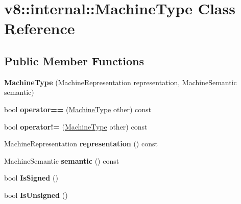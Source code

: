 \hypertarget{classv8_1_1internal_1_1_machine_type}{}\section{v8\+:\+:internal\+:\+:Machine\+Type Class Reference}
\label{classv8_1_1internal_1_1_machine_type}
\subsection*{Public Member Functions}
\begin{DoxyCompactItemize}
\item 
{\bfseries Machine\+Type} (Machine\+Representation representation, Machine\+Semantic semantic)\hypertarget{classv8_1_1internal_1_1_machine_type_a613ab0cec718bb37f6cf7af9528da6ab}{}\label{classv8_1_1internal_1_1_machine_type_a613ab0cec718bb37f6cf7af9528da6ab}

\item 
bool {\bfseries operator==} (\hyperlink{classv8_1_1internal_1_1_machine_type}{Machine\+Type} other) const \hypertarget{classv8_1_1internal_1_1_machine_type_a021cc8e5083de960e3554ac4ba031468}{}\label{classv8_1_1internal_1_1_machine_type_a021cc8e5083de960e3554ac4ba031468}

\item 
bool {\bfseries operator!=} (\hyperlink{classv8_1_1internal_1_1_machine_type}{Machine\+Type} other) const \hypertarget{classv8_1_1internal_1_1_machine_type_a56874913e3cb767662d23c1a69a856f4}{}\label{classv8_1_1internal_1_1_machine_type_a56874913e3cb767662d23c1a69a856f4}

\item 
Machine\+Representation {\bfseries representation} () const \hypertarget{classv8_1_1internal_1_1_machine_type_a6ba492e3b949ffd5b9dfff179cc133fd}{}\label{classv8_1_1internal_1_1_machine_type_a6ba492e3b949ffd5b9dfff179cc133fd}

\item 
Machine\+Semantic {\bfseries semantic} () const \hypertarget{classv8_1_1internal_1_1_machine_type_a1cf095a6761ee7b793cdd05ab4ba457d}{}\label{classv8_1_1internal_1_1_machine_type_a1cf095a6761ee7b793cdd05ab4ba457d}

\item 
bool {\bfseries Is\+Signed} ()\hypertarget{classv8_1_1internal_1_1_machine_type_ab8a574b74c3d3428c748832b27906945}{}\label{classv8_1_1internal_1_1_machine_type_ab8a574b74c3d3428c748832b27906945}

\item 
bool {\bfseries Is\+Unsigned} ()\hypertarget{classv8_1_1internal_1_1_machine_type_a5306967ff4208b12ddb34ba7160cdc70}{}\label{classv8_1_1internal_1_1_machine_type_a5306967ff4208b12ddb34ba7160cdc70}

\end{DoxyCompactItemize}
